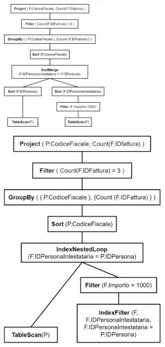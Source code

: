 \documentclass[a4paper,12pt]{article}
\begin{document}
\begin{minipage}{\textwidth}
\begin{multicols}{2}

\null \vfill
\includegraphics[height=6.5cm]{ Albero fisico 3.png }
\vfill \null

\columnbreak

\includegraphics[height=11cm]{ Albero fisico 3 indici.png }
\end{multicols}
\end{minipage}
\end{document}
